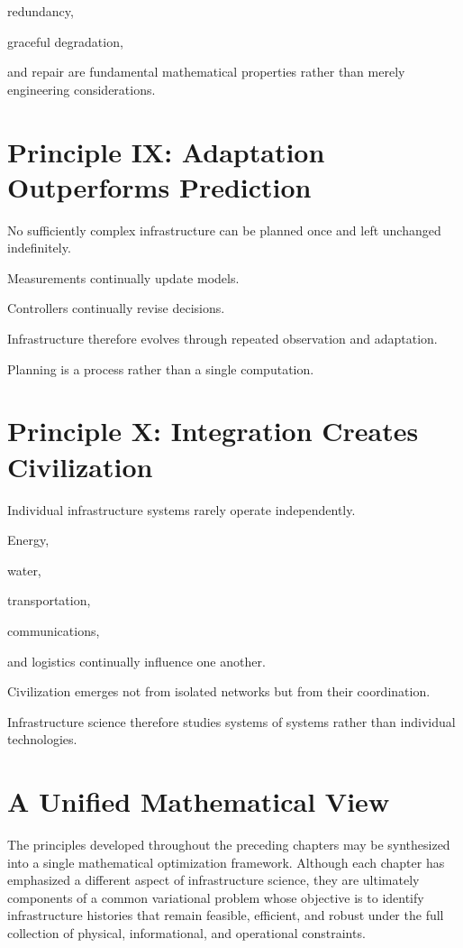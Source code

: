 \documentclass[11pt,fleqn]{book}
\numberwithin{equation}{chapter}
\theoremstyle{plain}
\theoremstyle{definition}
\theoremstyle{remark}
\begin{document}
redundancy,

graceful degradation,

and repair are fundamental mathematical properties rather than merely
engineering considerations.


\section{Principle IX: Adaptation Outperforms Prediction}

No sufficiently complex infrastructure can be planned once and left
unchanged indefinitely.

Measurements continually update models.

Controllers continually revise decisions.

Infrastructure therefore evolves through repeated observation and
adaptation.

Planning is a process rather than a single computation.


\section{Principle X: Integration Creates Civilization}

Individual infrastructure systems rarely operate independently.

Energy,

water,

transportation,

communications,

and logistics continually influence one another.

Civilization emerges not from isolated networks but from their
coordination.

Infrastructure science therefore studies systems of systems rather than
individual technologies.


\section{A Unified Mathematical View}

The principles developed throughout the preceding chapters may be synthesized into a single mathematical optimization framework. Although each chapter has emphasized a different aspect of infrastructure science, they are ultimately components of a common variational problem whose objective is to identify infrastructure histories that remain feasible, efficient, and robust under the full collection of physical, informational, and operational constraints.
\end{document}
